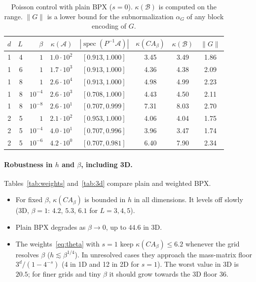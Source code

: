 \documentclass[11pt,a4paper]{article}
\newcommand{\A}{\mathcal{A}}
\newcommand{\B}{\mathcal{B}}
\theoremstyle{remark}
\begin{document}
\begin{table}[ht]
\centering\small
\begin{tabular}{rrrrcccc}
\toprule
$d$ & $L$ & $\beta$ & $\kappa(\A)$ & $|\operatorname{spec}(P^{-1}\A)|$ & $\kappa(CA_\beta)$ & $\kappa(\B)$ & $\|G\|$\\
\midrule
1 & 4 & $1$       & $1.0\cdot10^2$ & $[0.913,1.000]$ & 3.45 & 3.49 & 1.86\\
1 & 6 & $1$       & $1.7\cdot10^3$ & $[0.913,1.000]$ & 4.36 & 4.38 & 2.09\\
1 & 8 & $1$       & $2.6\cdot10^4$ & $[0.913,1.000]$ & 4.98 & 4.99 & 2.23\\
1 & 8 & $10^{-4}$ & $2.6\cdot10^3$ & $[0.708,1.000]$ & 4.43 & 4.50 & 2.11\\
1 & 8 & $10^{-8}$ & $2.6\cdot10^1$ & $[0.707,0.999]$ & 7.31 & 8.03 & 2.70\\
2 & 5 & $1$       & $2.1\cdot10^2$ & $[0.953,1.000]$ & 4.06 & 4.04 & 1.75\\
2 & 5 & $10^{-4}$ & $4.0\cdot10^1$ & $[0.707,0.996]$ & 3.96 & 3.47 & 1.74\\
2 & 5 & $10^{-6}$ & $4.2\cdot10^0$ & $[0.707,0.981]$ & 6.40 & 7.90 & 2.34\\
\bottomrule
\end{tabular}
\caption{Poisson control with plain BPX ($s=0$). $\kappa(\B)$ is computed on the
range. $\|G\|$ is a lower bound for the subnormalization $\alpha_G$ of any block
encoding of $G$.}
\label{tab:poisson}
\end{table}

\paragraph{Robustness in $h$ and $\beta$, including 3D.}
Tables~\ref{tab:weights} and~\ref{tab:3d} compare plain and weighted BPX.
\begin{itemize}
\item For fixed $\beta$, $\kappa(CA_\beta)$ is bounded in $h$ in all dimensions.
  It levels off slowly (3D, $\beta=1$: $4.2$, $5.3$, $6.1$ for $L=3,4,5$).
\item Plain BPX degrades as $\beta\to0$, up to $44.6$ in 3D.
\item The weights~\eqref{eq:theta} with $s=1$ keep $\kappa(CA_\beta)\le6.2$ whenever
  the grid resolves $\beta$ ($h\lesssim\beta^{1/4}$). In unresolved cases they
  approach the mass-matrix floor $3^d/(1-4^{-s})$ (4 in 1D and 12 in 2D for
  $s=1$). The worst value in 3D is $20.5$; for finer grids and tiny $\beta$ it
  should grow towards the 3D floor $36$.
\end{itemize}
\end{document}
